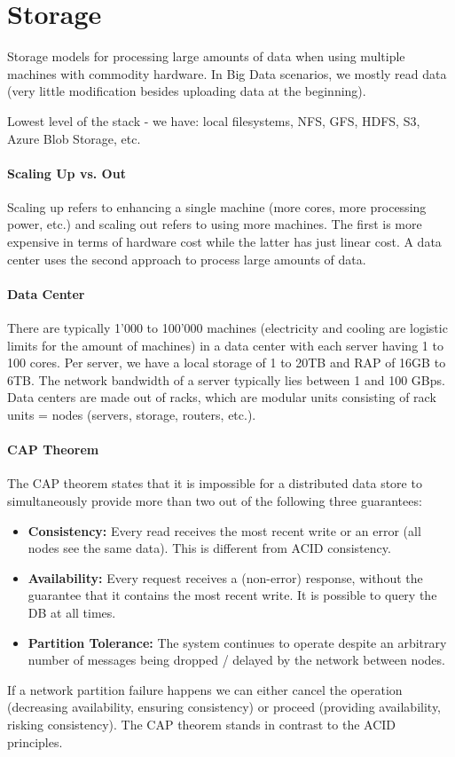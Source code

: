 \section{Storage}

Storage models for processing large amounts of data when using multiple machines with commodity hardware. In Big Data scenarios, we mostly read data (very little modification besides uploading data at the beginning).

Lowest level of the stack - we have: local filesystems, NFS, GFS, HDFS, S3, Azure Blob Storage, etc.

\paragraph{Scaling Up vs. Out}
Scaling up refers to enhancing a single machine (more cores, more processing power, etc.) and scaling out refers to using more machines. The first is more expensive in terms of hardware cost while the latter has just linear cost. A data center uses the second approach to process large amounts of data.

\paragraph{Data Center}
There are typically 1'000 to 100'000 machines (electricity and cooling are logistic limits for the amount of machines) in a data center with each server having 1 to 100 cores. Per server, we have a local storage of 1 to 20TB and RAP of 16GB to 6TB. The network bandwidth of a server typically lies between 1 and 100 GBps. Data centers are made out of racks, which are modular units consisting of rack units = nodes (servers, storage, routers, etc.).

\paragraph{CAP Theorem}
The CAP theorem states that it is impossible for a distributed data store to simultaneously provide more than two out of the following three guarantees:
\begin{itemize}
    \item \textbf{Consistency:} Every read receives the most recent write or an error (all nodes see the same data). This is different from ACID consistency.
    \item \textbf{Availability:} Every request receives a (non-error) response, without the guarantee that it contains the most recent write. It is possible to query the DB at all times.
    \item \textbf{Partition Tolerance:} The system continues to operate despite an arbitrary number of messages being dropped / delayed by the network between nodes.
\end{itemize}
If a network partition failure happens we can either cancel the operation (decreasing availability, ensuring consistency) or proceed (providing availability, risking consistency). The CAP theorem stands in contrast to the ACID principles.


